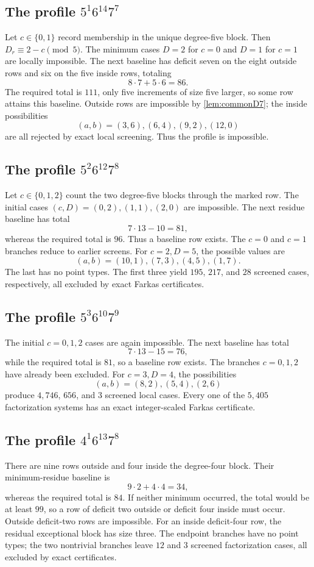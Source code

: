 \documentclass[10pt,a4paper]{amsart}
\begin{document}
\subsection{The profile $5^1 6^{14}7^7$}
Let $c\in\{0,1\}$ record membership in the unique degree-five block. Then $D_r\equiv2-c\pmod5$. The minimum cases $D=2$ for $c=0$ and $D=1$ for $c=1$ are locally impossible. The next baseline has deficit seven on the eight outside rows and six on the five inside rows, totaling
\[
 8\cdot7+5\cdot6=86.
\]
The required total is $111$, only five increments of size five larger, so some row attains this baseline. Outside rows are impossible by \cref{lem:commonD7}; the inside possibilities
\[
 (a,b)=(3,6),(6,4),(9,2),(12,0)
\]
are all rejected by exact local screening. Thus the profile is impossible.

\subsection{The profile $5^2 6^{12}7^8$}
Let $c\in\{0,1,2\}$ count the two degree-five blocks through the marked row. The initial cases $(c,D)=(0,2),(1,1),(2,0)$ are impossible. The next residue baseline has total
\[
 7\cdot13-10=81,
\]
whereas the required total is $96$. Thus a baseline row exists. The $c=0$ and $c=1$ branches reduce to earlier screens. For $c=2,D=5$, the possible values are
\[
 (a,b)=(10,1),(7,3),(4,5),(1,7).
\]
The last has no point types. The first three yield $195$, $217$, and $28$ screened cases, respectively, all excluded by exact Farkas certificates.

\subsection{The profile $5^3 6^{10}7^9$}
The initial $c=0,1,2$ cases are again impossible. The next baseline has total
\[
 7\cdot13-15=76,
\]
while the required total is $81$, so a baseline row exists. The branches $c=0,1,2$ have already been excluded. For $c=3,D=4$, the possibilities
\[
 (a,b)=(8,2),(5,4),(2,6)
\]
produce $4{,}746$, $656$, and $3$ screened local cases. Every one of the $5{,}405$ factorization systems has an exact integer-scaled Farkas certificate.

\subsection{The profile $4^1 6^{13}7^8$}
There are nine rows outside and four inside the degree-four block. Their minimum-residue baseline is
\[
 9\cdot2+4\cdot4=34,
\]
whereas the required total is $84$. If neither minimum occurred, the total would be at least $99$, so a row of deficit two outside or deficit four inside must occur. Outside deficit-two rows are impossible. For an inside deficit-four row, the residual exceptional block has size three. The endpoint branches have no point types; the two nontrivial branches leave $12$ and $3$ screened factorization cases, all excluded by exact certificates.
\end{document}

